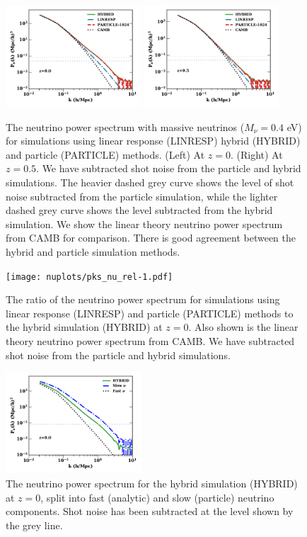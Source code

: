 \documentclass[useAMS, usenatbib]{mnras}
\begin{document}
\begin{figure}
\includegraphics[width=0.45\textwidth]{nuplots/pks-nu-1.pdf}
\includegraphics[width=0.45\textwidth]{nuplots/pks-nu-0_6667.pdf}
  \caption{The neutrino power spectrum with massive neutrinos ($M_\nu = 0.4$ eV) for simulations using linear response (LINRESP) hybrid (HYBRID) and particle (PARTICLE) methods. (Left) At $z=0$. (Right) At $z=0.5$. We have subtracted shot noise from the particle and hybrid simulations. The heavier dashed grey curve shows the level of shot noise subtracted from the particle simulation, while the lighter dashed grey curve shows the level subtracted from the hybrid simulation. We show the linear theory neutrino power spectrum from CAMB for comparison. There is good agreement between the hybrid and particle simulation methods.}
  \label{fig:neutrino_power}
\end{figure}

\begin{figure}
\texttt{[image: nuplots/pks\_nu\_rel-1.pdf]}
  \caption{The ratio of the neutrino power spectrum for simulations using linear response (LINRESP) and particle (PARTICLE) methods to the hybrid simulation (HYBRID) at $z=0$. Also shown is the linear theory neutrino power spectrum from CAMB. We have subtracted shot noise from the particle and hybrid simulations.}
  \label{fig:rel_neutrino_power}
\end{figure}

\begin{figure}
\includegraphics[width=0.45\textwidth]{nuplots/pks-nu-split-1.pdf}
  \caption{The neutrino power spectrum for the hybrid simulation (HYBRID) at $z=0$, split into fast (analytic) and slow (particle) neutrino components. Shot noise has been subtracted at the level shown by the grey line.}
  \label{fig:neutrino_power_split}
\end{figure}
\end{document}
